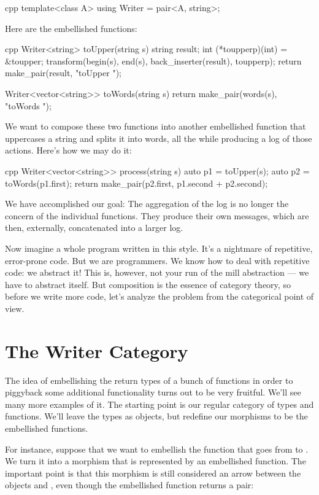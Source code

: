 \begin{snip}{cpp}
template<class A>
using Writer = pair<A, string>;
\end{snip}
Here are the embellished functions:

\begin{snip}{cpp}
Writer<string> toUpper(string s) {
    string result;
    int (*toupperp)(int) = &toupper;
    transform(begin(s), end(s), back_inserter(result), toupperp);
    return make_pair(result, "toUpper "); 
}

Writer<vector<string>> toWords(string s) { 
    return make_pair(words(s), "toWords ");
}
\end{snip}
We want to compose these two functions into another embellished function
that uppercases a string and splits it into words, all the while
producing a log of those actions. Here's how we may do it:

\begin{snip}{cpp}
Writer<vector<string>> process(string s) {
    auto p1 = toUpper(s);
    auto p2 = toWords(p1.first);
    return make_pair(p2.first, p1.second + p2.second);
}
\end{snip}
We have accomplished our goal: The aggregation of the log is no longer
the concern of the individual functions. They produce their own
messages, which are then, externally, concatenated into a larger log.

Now imagine a whole program written in this style. It's a nightmare of
repetitive, error-prone code. But we are programmers. We know how to
deal with repetitive code: we abstract it! This is, however, not your
run of the mill abstraction --- we have to abstract  itself. But composition is the essence of category theory,
so before we write more code, let's analyze the problem from the
categorical point of view.

\section{The Writer Category}

The idea of embellishing the return types of a bunch of functions in
order to piggyback some additional functionality turns out to be very
fruitful. We'll see many more examples of it. The starting point is our
regular category of types and functions. We'll leave the types as
objects, but redefine our morphisms to be the embellished functions.

For instance, suppose that we want to embellish the function
 that goes from  to . We turn it
into a morphism that is represented by an embellished function. The
important point is that this morphism is still considered an arrow
between the objects  and , even though the
embellished function returns a pair:


